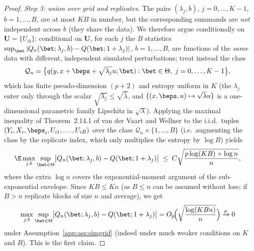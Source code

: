 \begin{proof}
\emph{Step 3: union over grid and replicates.} The pairs
$(\lambda_j,b)$, $j=0,\dots,K-1$, $b=1,\dots,B$, are at most $KB$ in
number, but the corresponding summands are \emph{not} independent across
$b$ (they share the data). We therefore argue conditionally on
$\bm U=\{U_{ib}\}$: conditional on $\bm U$, for each $j$ the $B$
statistics $\sup_{\bet}|Q_n(\bet;\lambda_j,b)-Q(\bet;1+\lambda_j)|$,
$b=1,\dots,B$, are functions of the \emph{same} data with different,
independent simulated perturbations; treat instead the class
\[
  \mathcal Q_n=\bigl\{q(y,x+\beps+\sqrt{\lambda_j}u;\bet):
  \bet\in\Theta,\ j=0,\dots,K-1\bigr\},
\]
which has finite pseudo-dimension $(p+2)$ and entropy uniform in $K$
(the $\lambda_j$ enter only through the scalar $\sqrt{\lambda_j}\le
\sqrt{\bar\lambda}$, and $\{(x,\beps,u)\mapsto
\sqrt{\lambda}u\}$ is a one-dimensional parametric family Lipschitz in
$\sqrt\lambda$). Applying the maximal inequality of Theorem~2.14.1 of van
der Vaart and Wellner to the i.i.d.\ tuples
$(Y_i,X_i,\beps_i,U_{i1},\dots,U_{iB})$ over the class
$\mathcal Q_n\times\{1,\dots,B\}$ (i.e.\ augmenting the class by the
replicate index, which only multiplies the entropy by $\log B$) yields
\[
  \E\max_{j,b}\sup_{\bet\in\Theta}\bigl|Q_n(\bet;\lambda_j,b)
  -Q(\bet;1+\lambda_j)\bigr|
  \;\le\; C\sqrt{\frac{p\log(KB)+\log n}{n}},
\]
where the extra $\log n$ covers the exponential-moment argument of the
sub-exponential envelope. Since $KB\le K n$ (as $B\le n$ can be assumed
without loss; if $B>n$ replicate blocks of size $n$ and average), we get
\[
  \max_{j,b}\sup_{\bet\in\Theta}\bigl|Q_n(\bet;\lambda_j,b)
  -Q(\bet;1+\lambda_j)\bigr|
  =O_p\!\Bigl(\sqrt{\frac{\log(KB n)}{n}}\Bigr)\xrightarrow{p}0
\]
under Assumption~\ref{app:ass:simgrid} (indeed under much weaker conditions
on $K$ and $B$). This is the first claim.


\end{proof}
